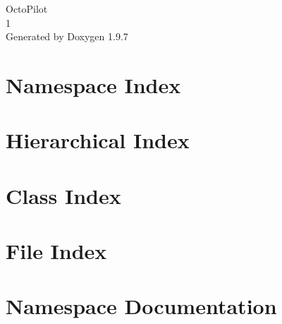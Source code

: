 \documentclass[twoside]{book}
\newcommand{\+}{\discretionary{\mbox{\scriptsize$\hookleftarrow$}}{}{}}
\newcommand{\clearemptydoublepage}{%
    \newpage{\pagestyle{empty}\cleardoublepage}%
  }
\begin{document}
  \raggedbottom
    \hypersetup{pageanchor=false,
                bookmarksnumbered=true,
                pdfencoding=unicode
               }
  \begin{titlepage}
  \vspace*{7cm}
  \begin{center}%
  {\Large Octo\+Pilot}\\
  [1ex]\large 1 \\
  \vspace*{1cm}
  {\large Generated by Doxygen 1.9.7}\\
  \end{center}
  \end{titlepage}
  \clearemptydoublepage
  \tableofcontents
  \clearemptydoublepage
  \hypersetup{pageanchor=true}

\chapter{Namespace Index}

\chapter{Hierarchical Index}

\chapter{Class Index}

\chapter{File Index}

\chapter{Namespace Documentation}

\end{document}
